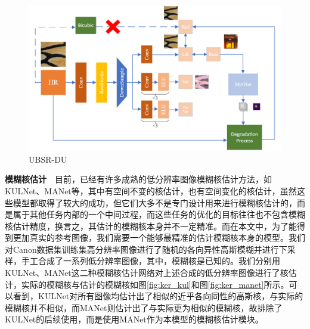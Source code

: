\begin{figure}[h]
    \centering
    \includegraphics[width=1.0\textwidth]{imgs/UBSR-DU.png}
    \caption{UBSR-DU}
    \label{fig:UBSR-DU}
\end{figure}


\noindent\textbf{模糊核估计}\ \ 目前，已经有许多成熟的低分辨率图像模糊核估计方法，如KULNet、MANet等，其中有空间不变的核估计，也有空间变化的核估计，虽然这些模型都取得了较大的成功，但它们大多不是专门设计用来进行模糊核估计的，而是属于其他任务内部的一个中间过程，而这些任务的优化的目标往往也不包含模糊核估计精度，换言之，其估计的模糊核本身并不一定精准。而在本文中，为了能得到更加真实的参考图像，我们需要一个能够最精准的估计模糊核本身的模型。我们对Canon数据集训练集高分辨率图像进行了随机的各向异性高斯模糊并进行下采样，手工合成了一系列低分辨率图像，其中，模糊核是已知的。我们分别用KULNet、MANet这二种模糊核估计网络对上述合成的低分辨率图像进行了核估计，实际的模糊核与估计的模糊核如图\ref{fig:ker_kul}和图\ref{fig:ker_manet}所示。可以看到，KULNet对所有图像均估计出了相似的近乎各向同性的高斯核，与实际的模糊核并不相似，而MANet则估计出了与实际更为相似的模糊核，故排除了KULNet的后续使用，而是使用MANet作为本模型的模糊核估计模块。


